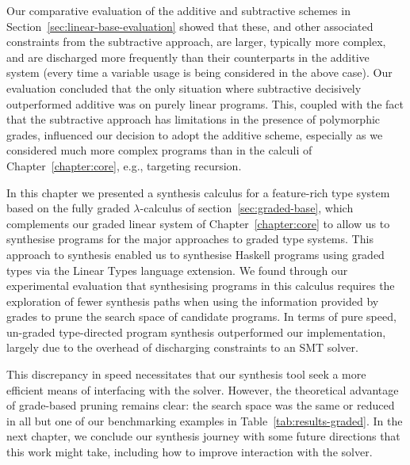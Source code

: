 Our comparative evaluation of the additive and subtractive schemes in
Section~\ref{sec:linear-base-evaluation} showed that these, and other associated
constraints from the subtractive approach, are larger, typically more complex,
and are discharged more frequently than their counterparts in the additive
system (every time a variable usage is being considered in the above case).
Our evaluation concluded that the only situation where subtractive decisively
outperformed additive was on purely linear programs. This, coupled with the fact
that the subtractive approach has limitations in the presence of polymorphic
grades, influenced our decision to adopt the additive scheme, especially as we
considered much more complex programs than in the calculi of
Chapter~\ref{chapter:core}, e.g., targeting recursion.

In this chapter we presented a synthesis calculus for a feature-rich type system
based on the fully graded $\lambda$-calculus of section~\ref{sec:graded-base},
which complements our graded linear system of Chapter~\ref{chapter:core} to
allow us to synthesise programs for the major approaches to graded type systems.
This approach to synthesis enabled us to synthesise Haskell programs using
graded types via the Linear Types language extension. We found through our
experimental evaluation that synthesising programs in this calculus requires the
exploration of fewer synthesis paths when using the information provided by
grades to prune the search space of candidate programs. In terms of pure speed,
un-graded type-directed program synthesis outperformed our implementation,
largely due to the overhead of discharging constraints to an SMT solver. 

This discrepancy in speed necessitates that our synthesis tool seek a more
efficient means of interfacing with the solver. However, the theoretical
advantage of grade-based pruning remains clear: the search space was the same or
reduced in all but one of our benchmarking examples in
Table~\ref{tab:results-graded}. In the next chapter, we conclude our synthesis
journey with some future directions that this work might take, including how to
improve interaction with the solver. 



